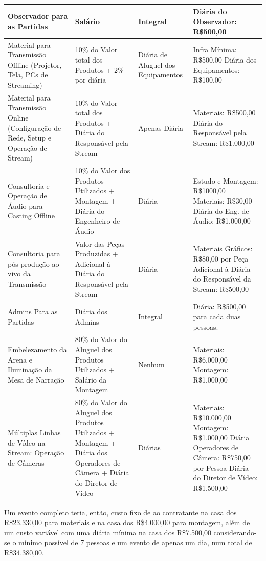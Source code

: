 \documentclass[a4paper, 12pt]{paper}
\begin{document}
\begin{table}[h!]
	\centering
	\begin{tabular}{p{3.5cm}p{3.5cm}p{3.5cm}p{3.5cm}}	
	Observador para as Partidas&Salário&Integral&Diária do Observador: R\$500,00\\	
	\hline					
	Material para Transmissão Offline (Projetor, Tela, PCs de Streaming)&10\% do Valor total dos Produtos + 2\% por diária&Diária de Aluguel dos Equipamentos&Infra Mínima: R\$500,00
	Diária dos Equipamentos: R\$100,00\\
	\hline		
	Material para Transmissão Online (Configuração de Rede, Setup e Operação de Stream)&10\% do Valor total dos Produtos + Diária do Responsável pela Stream&Apenas Diária&Materiais: R\$500,00
	Diária do Responsável pela Stream: R\$1.000,00\\
	\hline		
	Consultoria e Operação de Áudio para Casting Offline&10\% do Valor dos Produtos Utilizados + Montagem + Diária do Engenheiro de Áudio&Diária&Estudo e Montagem: R\$1000,00
	Materiais: R\$30,00
	Diária do Eng. de Áudio: R\$1.000,00\\
	\hline
	Consultoria para pós-produção ao vivo da Transmissão&Valor das Peças Produzidas + Adicional à Diária do Responsável pela Stream&Diária&Materiais Gráficos: R\$80,00 por Peça
	Adicional à Diária do Responsável da Stream: R\$500,00\\
	\hline
	Admins Para as Partidas&Diária dos Admins&Integral&Diária: R\$500,00 para cada duas pessoas.\\
	\hline
	Embelezamento da Arena e Iluminação da Mesa de Narração&80\% do Valor do Aluguel dos Produtos Utilizados + Salário da Montagem&Nenhum&Materiais: R\$6.000,00
	Montagem: R\$1.000,00\\			
	\hline
	Múltiplas Linhas de Vídeo na Stream: Operação de Câmeras&80\% do Valor do Aluguel dos Produtos Utilizados + Montagem + Diária dos Operadores de Câmera + Diária do Diretor de Vídeo&Diárias&Materiais: R\$10.000,00
	Montagem: R\$1.000,00
	Diária Operadores de Câmera: R\$750,00 por Pessoa
	Diária do Diretor de Vídeo: R\$1.500,00\\
	\hline
\end{tabular}
\end{table}
\newpage
Um evento completo teria, então, custo fixo de ao contratante na casa dos R\$23.330,00 para materiais e na casa dos R\$4.000,00 para montagem, além de um custo variável com uma diária mínima na casa dos R\$7.500,00 considerando-se o mínimo possível de 7 pessoas e um evento de apenas um dia, num total de R\$34.380,00.
\end{document}
